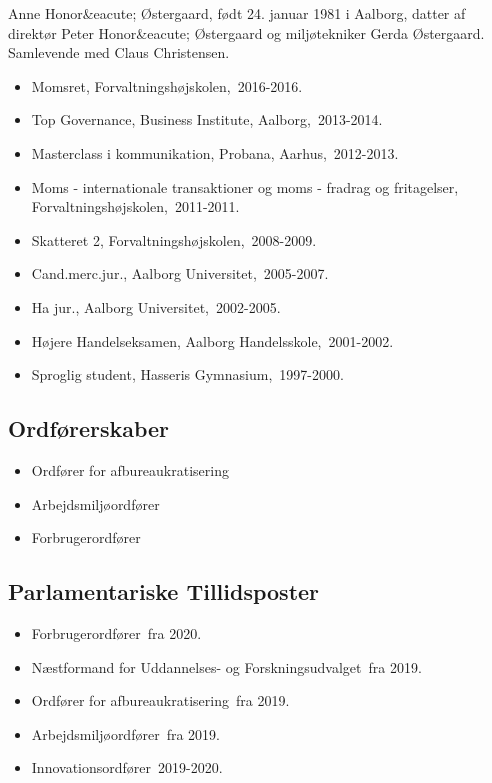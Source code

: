 \documentclass[11pt, a4paper]{awesome-cv}
\begin{document}
\makecvheader[R]
\makelettertitle
\begin{cvletter}
Anne Honor&eacute; Østergaard, født 24. januar 1981 i Aalborg, datter af direktør Peter Honor&eacute; Østergaard og miljøtekniker Gerda Østergaard. Samlevende med Claus Christensen.

\begin{itemize}
\item Momsret, Forvaltningshøjskolen, 2016-2016.
\item Top Governance, Business Institute, Aalborg, 2013-2014.
\item Masterclass i kommunikation, Probana, Aarhus, 2012-2013.
\item Moms - internationale transaktioner og moms - fradrag og fritagelser, Forvaltningshøjskolen, 2011-2011.
\item Skatteret 2, Forvaltningshøjskolen, 2008-2009.
\item Cand.merc.jur., Aalborg Universitet, 2005-2007.
\item Ha jur., Aalborg Universitet, 2002-2005.
\item Højere Handelseksamen, Aalborg Handelsskole, 2001-2002.
\item Sproglig student, Hasseris Gymnasium, 1997-2000.
\end{itemize}
\subsection*{Ordførerskaber}
\begin{itemize}
\item Ordfører for afbureaukratisering
\item Arbejdsmiljøordfører
\item Forbrugerordfører
\end{itemize}
\subsection*{Parlamentariske Tillidsposter}
\begin{itemize}
\item Forbrugerordfører fra 2020.
\item Næstformand for Uddannelses- og Forskningsudvalget fra 2019.
\item Ordfører for afbureaukratisering fra 2019.
\item Arbejdsmiljøordfører fra 2019.
\item Innovationsordfører 2019-2020.
\end{itemize}

\end{cvletter}
\end{document}
